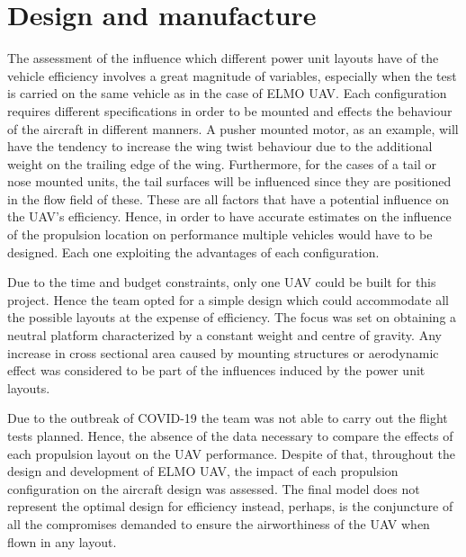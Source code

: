 \documentclass[../../main.tex]{subfiles}
\begin{document}

\section{Design and manufacture} \label{sec:project-review:design-and-manufacture}

The assessment of the influence which different power unit layouts have of the vehicle efficiency involves a great magnitude of variables, especially when the test is carried on the same vehicle as in the case of ELMO UAV.
Each configuration requires different specifications in order to be mounted and effects the behaviour of the aircraft in different manners.
A pusher mounted motor, as an example, will have the tendency to increase the wing twist behaviour due to the additional weight on the trailing edge of the wing.
Furthermore, for the cases of a tail or nose mounted units, the tail surfaces will be influenced since they are positioned in the flow field of these.
These are all factors that have a potential influence on the UAV’s efficiency.
Hence, in order to have accurate estimates on the influence of the propulsion location on performance multiple vehicles would have to be designed.
Each one exploiting the advantages of each configuration. 

Due to the time and budget constraints, only one UAV could be built for this project.
Hence the team opted for a simple design which could accommodate all the possible layouts at the expense of efficiency.
The focus was set on obtaining a neutral platform characterized by a constant weight and centre of gravity.
Any increase in cross sectional area caused by mounting structures or aerodynamic effect was considered to be part of the influences induced by the power unit layouts. 

Due to the outbreak of COVID-19 the team was not able to carry out the flight tests planned.
Hence, the absence of the data necessary to compare the effects of each propulsion layout on the UAV performance.
Despite of that, throughout the design and development of ELMO UAV, the impact of each propulsion configuration on the aircraft design was assessed.
The final model does not represent the optimal design for efficiency instead, perhaps, is the conjuncture of all the compromises demanded to ensure the airworthiness of the UAV when flown in any layout. 
\end{document}
